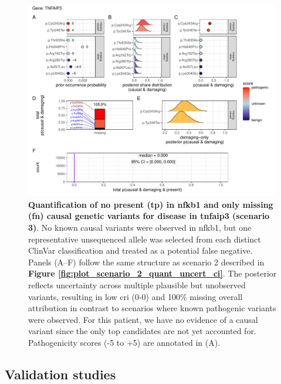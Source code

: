 \begin{figure}[ht]
  \centering
  \includegraphics[width=0.99\textwidth]{../images/plot_scenario_3_quant_uncert_ci.pdf}
  \caption{
 \textbf{Quantification of no present (\ac{tp}) in \ac{nfkb1} and only missing (\ac{fn}) causal genetic variants for disease in \ac{tnfaip3} (scenario 3)}.
No known causal variants were observed in \ac{nfkb1}, but one representative unsequenced allele was selected from each distinct ClinVar classification and treated as a potential false negative.  
Panels (A–F) follow the same structure as scenario 2 described in \textbf{Figure \ref{fig:plot_scenario_2_quant_uncert_ci}}.  
The posterior reflects uncertainty across multiple plausible but unobserved variants, resulting in low \ac{cri} (0-0) and 100\% missing overall attribution in contrast to scenarios where known pathogenic variants were observed. For this patient, we have no evidence of a causal variant since the only top candidates are not yet accounted for.
Pathogenicity scores (-5 to +5) are annotated in (A).
  }
  \label{fig:plot_scenario_3_quant_uncert_ci}
\end{figure}

\FloatBarrier
\subsection{Validation studies}

